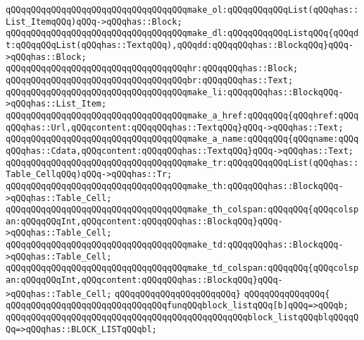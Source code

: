 \verb|qQQqqQQqqQQqqQQqqQQqqQQqqQQqqQQqqQQqmake_ol:qQQqqQQqqQQqList(qQQqhas::List_ItemqQQq)qQQq->qQQqhas::Block;|\newline
\verb|qQQqqQQqqQQqqQQqqQQqqQQqqQQqqQQqqQQqmake_dl:qQQqqQQqqQQqListqQQq{qQQqdt:qQQqqQQqList(qQQqhas::TextqQQq),qQQqdd:qQQqqQQqhas::BlockqQQq}qQQq->qQQqhas::Block;|\newline
\verb|qQQqqQQqqQQqqQQqqQQqqQQqqQQqqQQqqQQqhr:qQQqqQQqhas::Block;|\newline
\verb|qQQqqQQqqQQqqQQqqQQqqQQqqQQqqQQqqQQqbr:qQQqqQQqhas::Text;|\newline
\newline
\verb|qQQqqQQqqQQqqQQqqQQqqQQqqQQqqQQqqQQqmake_li:qQQqqQQqhas::BlockqQQq->qQQqhas::List_Item;|\newline
\newline
\verb|qQQqqQQqqQQqqQQqqQQqqQQqqQQqqQQqqQQqmake_a_href:qQQqqQQq{qQQqhref:qQQqqQQqhas::Url,qQQqcontent:qQQqqQQqhas::TextqQQq}qQQq->qQQqhas::Text;|\newline
\verb|qQQqqQQqqQQqqQQqqQQqqQQqqQQqqQQqqQQqmake_a_name:qQQqqQQq{qQQqname:qQQqqQQqhas::Cdata,qQQqcontent:qQQqqQQqhas::TextqQQq}qQQq->qQQqhas::Text;|\newline
\newline
\verb|qQQqqQQqqQQqqQQqqQQqqQQqqQQqqQQqqQQqmake_tr:qQQqqQQqqQQqList(qQQqhas::Table_CellqQQq)qQQq->qQQqhas::Tr;|\newline
\verb|qQQqqQQqqQQqqQQqqQQqqQQqqQQqqQQqqQQqmake_th:qQQqqQQqhas::BlockqQQq->qQQqhas::Table_Cell;|\newline
\verb|qQQqqQQqqQQqqQQqqQQqqQQqqQQqqQQqqQQqmake_th_colspan:qQQqqQQq{qQQqcolspan:qQQqqQQqInt,qQQqcontent:qQQqqQQqhas::BlockqQQq}qQQq->qQQqhas::Table_Cell;|\newline
\verb|qQQqqQQqqQQqqQQqqQQqqQQqqQQqqQQqqQQqmake_td:qQQqqQQqhas::BlockqQQq->qQQqhas::Table_Cell;|\newline
\verb|qQQqqQQqqQQqqQQqqQQqqQQqqQQqqQQqqQQqmake_td_colspan:qQQqqQQq{qQQqcolspan:qQQqqQQqInt,qQQqcontent:qQQqqQQqhas::BlockqQQq}qQQq->qQQqhas::Table_Cell;|\newline
\newline
\verb|qQQqqQQqqQQqqQQqqQQqqQQq}|\newline
\verb|qQQqqQQqqQQqqQQq{|\newline
\verb|qQQqqQQqqQQqqQQqqQQqqQQqqQQqqQQqfunqQQqblock_listqQQq[b]qQQq=>qQQqb;|\newline
\verb|qQQqqQQqqQQqqQQqqQQqqQQqqQQqqQQqqQQqqQQqqQQqqQQqblock_listqQQqblqQQqqQQq=>qQQqhas::BLOCK_LISTqQQqbl;|\newline
